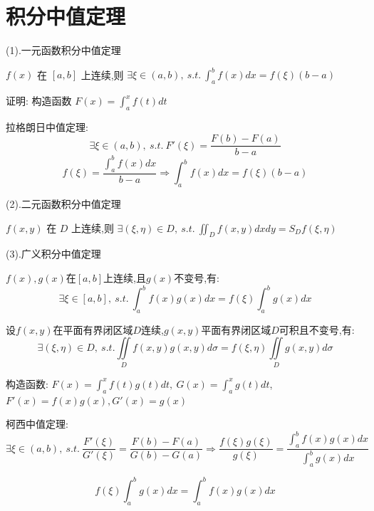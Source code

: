 \section{积分中值定理}
\begin{theorem}[积分中值定理]

	(1).一元函数积分中值定理

	$f(x)$ 在 $[a,b]$ 上连续,则 $\displaystyle{\exists \xi\in(a,b),\ s.t.\ \int_{a}^{b}f(x)dx=f(\xi)(b-a)}$

	证明: 构造函数 $F(x)=\int_{a}^{x}f(t)dt$

	拉格朗日中值定理: 
	$$\exists \xi\in(a,b),\ s.t.\ F'(\xi)=\frac{F(b)-F(a)}{b-a}$$
	$$f(\xi)=\frac{\int_{a}^{b}f(x)dx}{b-a}\Rightarrow \int_{a}^{b}f(x)dx=f(\xi)(b-a)$$

	(2).二元函数积分中值定理

	$f(x,y)$ 在 $D$ 上连续,则 $\exists (\xi,\eta)\in D,\ s.t.\ \iint_{D}f(x,y)dxdy=S_{D}f(\xi,\eta)$

	(3).广义积分中值定理

	$f(x),g(x)$在$[a,b]$上连续,且$g(x)$不变号,有:
	$$\exists \xi\in[a,b],\ s.t.\ \int_{a}^{b}f(x)g(x)dx=f(\xi)\int_{a}^{b}g(x)dx$$

	设$f(x,y)$在平面有界闭区域$D$连续,$g(x,y)$平面有界闭区域$D$可积且不变号,有: $$\exists (\xi,\eta)\in D,\ s.t. \iint\limits_{D}f(x,y)g(x,y)d\sigma=f(\xi,\eta)\iint\limits_{D}g(x,y)d\sigma$$
	\begin{anymark}[注]
		构造函数: $F(x)=\int_{a}^{x}f(t)g(t)dt,\ G(x)=\int_{a}^{x}g(t)dt$,$F'(x) =f(x)g(x),G'(x) = g(x)$

		柯西中值定理:
		$$\exists \xi\in(a,b),\ s.t.\ \dfrac{F'(\xi)}{G'(\xi)}=\dfrac{F(b)-F(a)}{G(b)-G(a)}\Rightarrow \dfrac{f(\xi)g(\xi)}{g(\xi)}=\dfrac{\int_{a}^{b}f(x)g(x)dx}{\int_{a}^{b}g(x)dx}$$

		$$f(\xi)\int_{a}^{b}g(x)dx=\int_{a}^{b}f(x)g(x)dx$$
	\end{anymark}
\end{theorem}
